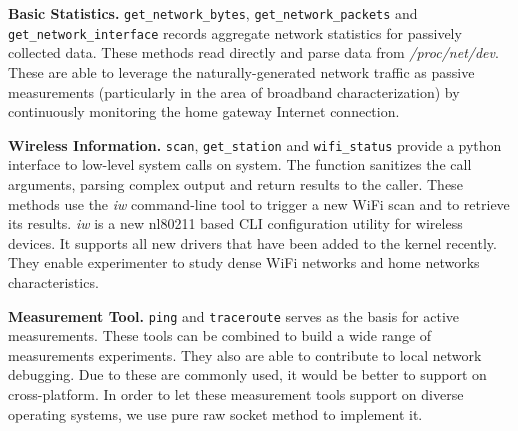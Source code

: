 {\textbf{Basic Statistics.} \texttt{get\_network\_bytes}, \texttt{get\_network\_packets} and \texttt{get\_network\_interface} records aggregate network statistics for passively collected data. These methods read directly and parse data from \emph{/proc/net/dev}. These are able to leverage the naturally-generated network traffic as passive measurements (particularly in the area of broadband characterization) by continuously monitoring the home gateway Internet connection.

\textbf{Wireless Information.} \texttt{scan}, \texttt{get\_station} and \texttt{wifi\_status} provide a python interface to low-level system calls on system. The function sanitizes the call arguments, parsing complex output and return results to the caller. These methods use the \emph{iw} command-line tool to trigger a new WiFi scan and to retrieve its results. \emph{iw} is a new nl80211 based CLI configuration utility for wireless devices. It supports all new drivers that have been added to the kernel recently\cite{iw}. They enable experimenter to study dense WiFi networks and home networks characteristics.

\textbf{Measurement Tool.} \texttt{ping} and \texttt{traceroute} serves as the basis for active measurements. These tools can be combined to build a wide range of measurements experiments. They also are able to contribute to local network debugging. Due to these are commonly used, it would be better to support on cross-platform. In order to let these measurement tools support on diverse operating systems, we use pure raw socket method to implement it. 


}
